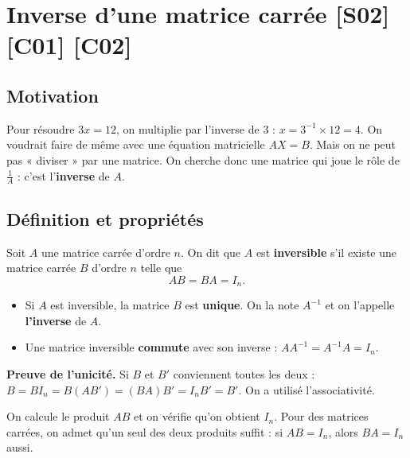 \documentclass[a4paper,11pt]{article}
\begin{document}
\needspace{7cm}
\section{Inverse d'une matrice carrée \hfill {\normalsize\color{uimmred}[S02] [C01] [C02]}}\label{sec:inverse}

\subsection{Motivation}\label{subsec:motivation}

Pour résoudre $3x = 12$, on multiplie par l'inverse de $3$ : $x = 3^{-1}\times 12 = 4$. On voudrait faire de même avec une équation matricielle $AX = B$. Mais on ne peut pas « diviser » par une matrice. On cherche donc une matrice qui joue le rôle de $\frac{1}{A}$ : c'est l'\textbf{inverse} de $A$.

\subsection{Définition et propriétés}\label{subsec:definverse}

\begin{definition}
Soit $A$ une matrice carrée d'ordre $n$. On dit que $A$ est \textbf{inversible} s'il existe une matrice carrée $B$ d'ordre $n$ telle que
\[
AB = BA = I_n.
\]
\end{definition}

\begin{theoreme}\label{th:unicite}
\begin{itemize}
  \item Si $A$ est inversible, la matrice $B$ est \textbf{unique}. On la note $A^{-1}$ et on l'appelle \textbf{l'inverse} de $A$.
  \item Une matrice inversible \textbf{commute} avec son inverse : $AA^{-1} = A^{-1}A = I_n$.
\end{itemize}
\textbf{Preuve de l'unicité.} Si $B$ et $B'$ conviennent toutes les deux : $B = BI_n = B(AB') = (BA)B' = I_nB' = B'$. On a utilisé l'associativité.
\end{theoreme}

\begin{methode}\label{meth:montrerinverse}
On calcule le produit $AB$ et on vérifie qu'on obtient $I_n$. Pour des matrices carrées, on admet qu'un seul des deux produits suffit : si $AB=I_n$, alors $BA=I_n$ aussi.
\end{methode}
\end{document}
